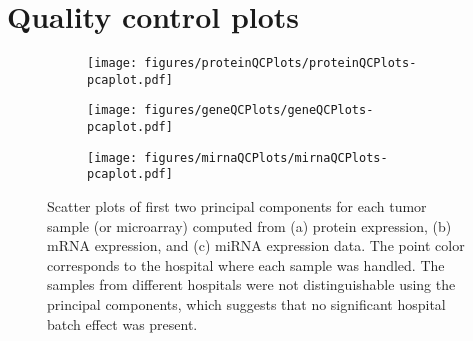


\section{Quality control plots\label{app:qc-plots}}


\begin{figure}[!h]
	\centering
	\begin{subfigure}{.7\textwidth}
		\centering
		\texttt{[image: figures/proteinQCPlots/proteinQCPlots-pcaplot.pdf]}
	\end{subfigure}
	\begin{subfigure}{.48\textwidth}
		\centering
		\texttt{[image: figures/geneQCPlots/geneQCPlots-pcaplot.pdf]}
	\end{subfigure}
	\begin{subfigure}{.48\textwidth}
		\centering
		\texttt{[image: figures/mirnaQCPlots/mirnaQCPlots-pcaplot.pdf]}
	\end{subfigure}

	\caption{Scatter plots of first two principal components for each tumor sample (or microarray)
	computed from (a) protein expression, (b) mRNA expression, and (c) miRNA expression data.
	The point color corresponds to the hospital where each sample was handled. The samples
	from different hospitals were not distinguishable using the principal components, which
	suggests that no significant hospital batch effect was present.}
	\label{fig:qc-pca}
\end{figure}


